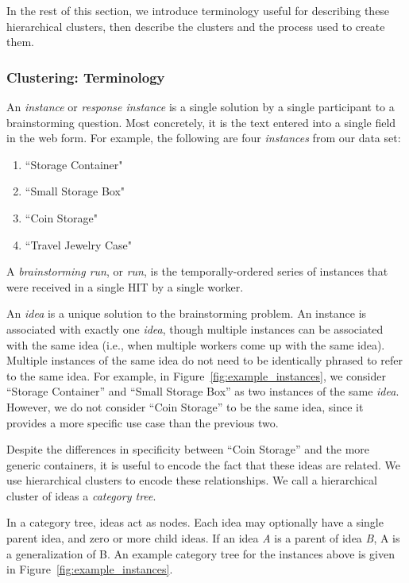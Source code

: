 In the rest of this section, we introduce terminology useful for describing these hierarchical clusters, then describe the clusters and the process used to create them.

\subsubsection{Clustering: Terminology}
An \emph{instance} or \emph{response instance} is a single solution by a single participant to a brainstorming question. Most concretely, it is the text entered into a single field in the web form. For example, the following are four \emph{instances} from our data set:

\begin{enumerate}
    \item ``Storage Container"
    \item ``Small Storage Box"
    \item ``Coin Storage"
    \item ``Travel Jewelry Case"
\end{enumerate}

A \emph{brainstorming run}, or \emph{run}, is the temporally-ordered series of instances that were received in a single HIT by a single worker.

An \emph{idea} is a unique solution to the brainstorming problem. An instance is associated with exactly one \emph{idea}, though multiple instances can be associated with the same idea (i.e., when multiple workers come up with the same idea). Multiple instances of the same idea do not need to be identically phrased to refer to the same idea. For example, in Figure~\ref{fig:example_instances}, we consider ``Storage Container'' and ``Small Storage Box'' as two instances of the same \emph{idea}. However, we do not consider ``Coin Storage'' to be the same idea, since it provides a more specific use case than the previous two.

Despite the differences in specificity between ``Coin Storage'' and the more generic containers, it is useful to encode the fact that these ideas are related. We use hierarchical clusters to encode these relationships. We call a hierarchical cluster of ideas a \emph{category tree}.

In a category tree, ideas act as nodes. Each idea may optionally have a single parent idea, and zero or more child ideas. If an idea \emph{A} is a parent of idea \emph{B}, A is a generalization of B. An example category tree for the instances above is given in Figure~\ref{fig:example_instances}.

